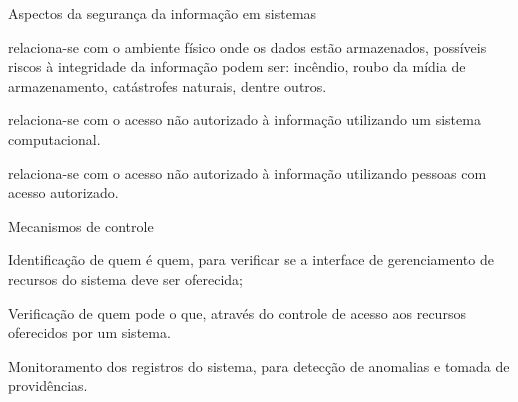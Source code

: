 \begin{frame}{Aspectos da segurança da informação em sistemas}

  \begin{description}[<+-| alert@+>]
  \item[Físico:] relaciona-se com o ambiente físico onde os dados
    estão armazenados, possíveis riscos à integridade da informação
    podem ser: incêndio, roubo da mídia de armazenamento, catástrofes
    naturais, dentre outros.
  \item[Lógico:] relaciona-se com o acesso não autorizado à informação
    utilizando um sistema computacional.
  \item[Humano:] relaciona-se com o acesso não autorizado à informação
    utilizando pessoas com acesso autorizado.
  \end{description}

\end{frame}

\begin{frame}{Mecanismos de controle}
  
  \begin{description}[<+-| alert@+>]
  \item[Autenticação] Identificação de quem é quem, para verificar se
    a interface de gerenciamento de recursos do sistema deve ser
    oferecida;

  \item[Autorização] Verificação de quem pode o que, através do
    controle de acesso aos recursos oferecidos por um sistema.

  \item[Auditoria] Monitoramento dos registros do sistema, para 
    detecção de anomalias e tomada de providências.
  \end{description}

\end{frame}


